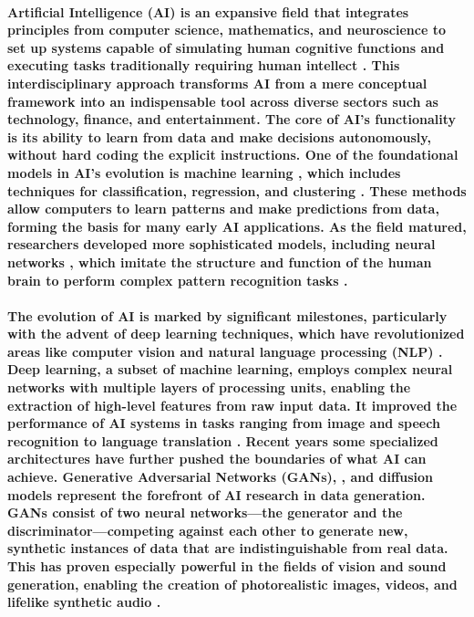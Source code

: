 \documentclass[11pt,a4paper,oneside]{report}
\begin{document}
\paragraph{Artificial Intelligence (AI) is an expansive field that integrates principles from computer science, mathematics, and neuroscience to set up systems capable of simulating human cognitive functions and executing tasks traditionally requiring human intellect \cite{russell2010artificial}. 
This interdisciplinary approach transforms AI from a mere conceptual framework into an indispensable tool across diverse sectors such as technology, finance, and entertainment. 
The core of AI's functionality is its ability to learn from data and make decisions autonomously, without hard coding the explicit instructions. 
One of the foundational models in AI's evolution is machine learning \cite{jordan2015machine}, which includes techniques for classification, regression, and clustering \cite{huang2022large}. 
These methods allow computers to learn patterns and make predictions from data, forming the basis for many early AI applications. 
As the field matured, researchers developed more sophisticated models, including neural networks \cite{abiodun2018state}, which imitate the structure and function of the human brain to perform complex pattern recognition tasks \cite{schmidhuber2015deep}.
}
\paragraph{The evolution of AI is marked by significant milestones, particularly with the advent of deep learning \cite{lecun2015deep} techniques, which have revolutionized areas like computer vision \cite{voulodimos2018deep} and natural language processing (NLP) \cite{chowdhary2020natural}. 
Deep learning, a subset of machine learning, employs complex neural networks with multiple layers of processing units, enabling the extraction of high-level features from raw input data. 
It improved the performance of AI systems in tasks ranging from image and speech recognition to language translation \cite{goodfellow2016deep}.
Recent years some specialized architectures have further pushed the boundaries of what AI can achieve. 
Generative Adversarial Networks (GANs), \cite{goodfellow2014generative} \cite{vondrick2016generating} \cite{tulyakov2018mocogan} \cite{clark2019adversarial} \cite{brooks2022generating}, and diffusion models \cite{rombach2022high} \cite{ho2022imagen} \cite{blattmann2023align} \cite{gupta2023photorealistic} represent the forefront of AI research in data generation. 
GANs consist of two neural networks—the generator and the discriminator—competing against each other to generate new, synthetic instances of data that are indistinguishable from real data. 
This has proven especially powerful in the fields of vision and sound generation, enabling the creation of photorealistic images, videos, and lifelike synthetic audio \cite{granot2022drop}.
}
\end{document}
